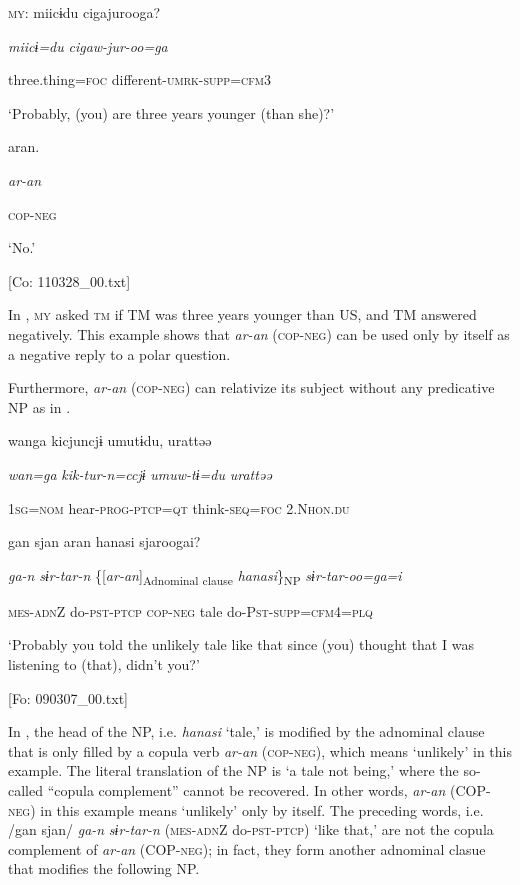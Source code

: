   \textsc{my}:  miicɨdu  cigajurooga?

    \textit{miicɨ=du}  \textit{cigaw-jur-oo=ga}

    three.thing=\textsc{foc}  different-\textsc{umrk}-\textsc{supp}=\textsc{cfm}3

    ‘Probably, (you) are three years younger (than she)?’

  {\TM}
\glll  aran.

    \textit{ar-an}

    \textsc{cop}-\textsc{neg}

    ‘No.’

    [Co: 110328\_00.txt]
\z

In , \textsc{my} asked \textsc{tm} if TM was three years younger than US, and TM answered negatively. This example shows that \textit{ar-an} (\textsc{cop}-\textsc{neg}) can be used only by itself as a negative reply to a polar question.

  Furthermore, \textit{ar-an} (\textsc{cop}-\textsc{neg}) can relativize its subject without any predicative NP as in .

\ea\label{ex:8-41}
  {\TM}
\glll  wanga  kicjuncjɨ  umutɨdu,  urattəə

    \textit{wan=ga}  \textit{kik-tur-n=ccjɨ}  \textit{umuw-tɨ=du}  \textit{urattəə}

    1\textsc{sg}=\textsc{nom}  hear-\textsc{prog}-\textsc{ptcp}=\textsc{qt}  think-\textsc{seq}=\textsc{foc}  2.N\textsc{hon}.\textsc{du}

    gan  sjan  aran  hanasi  sjaroogai?

    \textit{ga-n}  \textit{sɨr-tar-n}  \{[\textit{ar-an}]\textsubscript{Adnominal clause}  \textit{hanasi}\}\textsubscript{NP}  \textit{sɨr-tar-oo=ga=i}

    \textsc{mes}-\textsc{adn}Z  do-\textsc{pst}-\textsc{ptcp}  \textsc{cop}-\textsc{neg}  tale  do-P\textsc{st}-\textsc{supp}=\textsc{cfm}4=\textsc{plq}

    ‘Probably you told the unlikely tale like that since (you) thought that I was listening to (that), didn’t you?’

    [Fo: 090307\_00.txt]
\z

In , the head of the NP, i.e. \textit{hanasi} ‘tale,’ is modified by the adnominal clause that is only filled by a copula verb \textit{ar-an} (\textsc{cop}-\textsc{neg}), which means ‘unlikely’ in this example. The literal translation of the NP is ‘a tale not being,’ where the so-called “copula complement” cannot be recovered. In other words, \textit{ar-an} (COP-\textsc{neg}) in this example means ‘unlikely’ only by itself. The preceding words, i.e. /gan sjan/ \textit{ga-n} \textit{sɨr-tar-n} (\textsc{mes}-\textsc{adn}Z do-\textsc{pst}-\textsc{ptcp}) ‘like that,’ are not the copula complement of \textit{ar-an} (COP-\textsc{neg}); in fact, they form another adnominal clasue that modifies the following NP.

